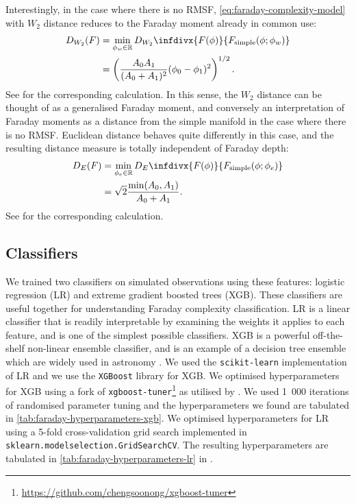     Interestingly, in the case where there is no RMSF, \autoref{eq:faraday-complexity-model} with $W_2$ distance reduces to the Faraday moment already in common use:
    \begin{align}
        D_{W_2}(F) &= \min_{\phi_w \in \mathbb{R}} D_{W_2}\infdivx{F(\phi)}{F_{\mathrm{simple}}(\phi; \phi_w)}\label{eq:faraday-W2-distance}\\
            &= \left(\frac{A_0A_1}{(A_0 + A_1)^2} (\phi_0 - \phi_1)^2\right)^{1/2}.
    \end{align}
    See  for the corresponding calculation. In this sense, the $W_2$ distance can be thought of as a generalised Faraday moment, and conversely an interpretation of Faraday moments as a distance from the simple manifold in the case where there is no RMSF. Euclidean distance behaves quite differently in this case, and the resulting distance measure is totally independent of Faraday depth:
    \begin{align}
        D_{E}(F) &= \min_{\phi_e \in \mathbb{R}} D_E\infdivx{F(\phi)}{F_{\mathrm{simple}}(\phi; \phi_e)}\label{eq:faraday-Euclidean-distance}\\
            &= \sqrt{2} \frac{\min(A_0, A_1)}{A_0 + A_1}.
    \end{align}
    See  for the corresponding calculation.


  \subsection{Classifiers}
  \label{sec:faraday-classifiers}

    We trained two classifiers on simulated observations using these features: logistic regression (LR) and extreme gradient boosted trees (XGB). These classifiers are useful together for understanding Faraday complexity classification. LR is a linear classifier that is readily interpretable by examining the weights it applies to each feature, and is one of the simplest possible classifiers. XGB is a powerful off-the-shelf non-linear ensemble classifier, and is an example of a decision tree ensemble which are widely used in astronomy \citep[e.g.][]{machado_poletti_valle_shaping_2020,hlozek20lsst}. We used the \texttt{scikit-learn} implementation of LR and we use the \texttt{XGBoost} library for XGB. We optimised hyperparameters for XGB using a fork of \texttt{xgboost-tuner}\footnote{\url{https://github.com/chengsoonong/xgboost-tuner}} as utilised by \citet{zhu20mutagenic}. We used 1~000 iterations of randomised parameter tuning and the hyperparameters we found are tabulated in \autoref{tab:faraday-hyperparameters-xgb}. We optimised hyperparameters for LR using a 5-fold cross-validation grid search implemented in \texttt{sklearn.model\textunderscore{}selection.GridSearchCV}. The resulting hyperparameters are tabulated in \autoref{tab:faraday-hyperparameters-lr} in .

